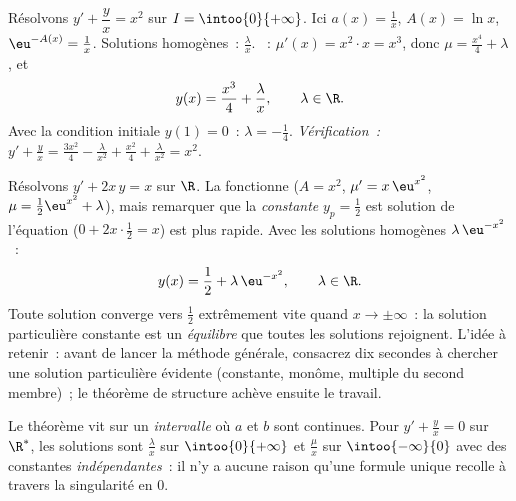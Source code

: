 \begin{example}\label{ex:b1:diffeq:order1}
Résolvons $y' + \dfrac{y}{x} = x^2$ sur $I = \intoo{0}{+\infty}$. Ici
$a(x) = \frac 1x$, $A(x) = \ln x$, $\eu^{-A(x)} = \frac 1x$. Solutions
homogènes~: $\frac{\lambda}{x}$. ~:
$\mu'(x) = x^2 \cdot x = x^3$, donc $\mu = \frac{x^4}{4} + \lambda$, et
\[
y(x) = \frac{x^3}{4} + \frac{\lambda}{x}, \qquad \lambda \in \R .
\]
Avec la condition initiale $y(1) = 0$~: $\lambda = -\frac14$.
\emph{Vérification~:} $y' + \frac yx = \frac{3x^2}{4} -
\frac{\lambda}{x^2} + \frac{x^2}{4} + \frac{\lambda}{x^2} = x^2$.
\end{example}

\begin{example}\label{ex:b1:diffeq:guess}
Résolvons $y' + 2x\,y = x$ sur $\R$. La 
fonctionne ($A = x^2$, $\mu' = x\,\eu^{x^2}$, $\mu = \frac12\eu^{x^2}
+ \lambda$), mais remarquer que la \emph{constante} $y_p = \frac12$
est solution de l'équation ($0 + 2x\cdot\frac12 = x$) est plus rapide.
Avec les solutions homogènes $\lambda\,\eu^{-x^2}$~:
\[
y(x) = \frac12 + \lambda\,\eu^{-x^2}, \qquad \lambda \in \R .
\]
Toute solution converge vers $\frac12$ extrêmement vite quand $x \to
\pm\infty$~: la solution particulière constante est un
\emph{équilibre} que toutes les solutions rejoignent. L'idée à
retenir~: avant de lancer la méthode générale, consacrez dix secondes
à chercher une solution particulière évidente (constante, monôme,
multiple du second membre)~; le théorème de structure achève ensuite
le travail.
\end{example}

\begin{remark}
Le théorème vit sur un \emph{intervalle} où $a$ et $b$ sont continues.
Pour $y' + \frac yx = 0$ sur $\R^*$, les solutions sont
$\frac{\lambda}{x}$ sur $\intoo{0}{+\infty}$ et $\frac{\mu}{x}$ sur
$\intoo{-\infty}{0}$ avec des constantes \emph{indépendantes}~: il n'y
a aucune raison qu'une formule unique recolle à travers la singularité
en $0$.
\end{remark}

